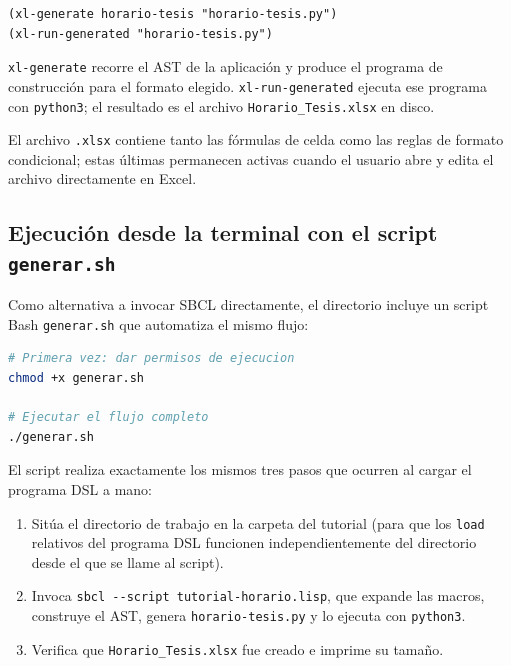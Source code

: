 \documentclass[12pt,a4paper]{report}
\begin{document}
\begin{lstlisting}[caption={Compilacion y ejecucion desde el programa DSL.}]
(xl-generate horario-tesis "horario-tesis.py")
(xl-run-generated "horario-tesis.py")
\end{lstlisting}

\texttt{xl-generate} recorre el AST de la aplicación y produce el programa de
construcción para el formato elegido.
\texttt{xl-run-generated} ejecuta ese programa con \texttt{python3};
el resultado es el archivo \texttt{Horario\_Tesis.xlsx} en disco.

El archivo \texttt{.xlsx} contiene tanto las fórmulas de celda como las
reglas de formato condicional; estas últimas permanecen activas cuando el
usuario abre y edita el archivo directamente en Excel.

\subsection{Ejecución desde la terminal con el script \texttt{generar.sh}}

Como alternativa a invocar SBCL directamente, el directorio incluye un
script Bash \texttt{generar.sh} que automatiza el mismo flujo:

\begin{lstlisting}[language=bash, numbers=none, backgroundcolor=\color{gray!10},
                   basicstyle=\ttfamily\small, keywordstyle={}]
# Primera vez: dar permisos de ejecucion
chmod +x generar.sh

# Ejecutar el flujo completo
./generar.sh
\end{lstlisting}

El script realiza exactamente los mismos tres pasos que ocurren al cargar
el programa DSL a mano:

\begin{enumerate}
  \item Sitúa el directorio de trabajo en la carpeta del tutorial (para que
        los \texttt{load} relativos del programa DSL funcionen
        independientemente del directorio desde el que se llame al script).
  \item Invoca \texttt{sbcl -{}-script tutorial-horario.lisp}, que expande
        las macros, construye el AST, genera \texttt{horario-tesis.py} y lo
        ejecuta con \texttt{python3}.
  \item Verifica que \texttt{Horario\_Tesis.xlsx} fue creado e imprime su
        tamaño.
\end{enumerate}
\end{document}
